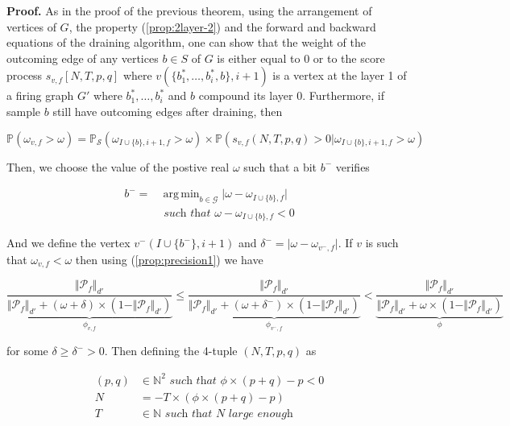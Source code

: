 \documentclass[a4paper, 11pt]{article}
\DeclareMathOperator*{\argmin}{arg\,min}
\begin{document}
\textbf{Proof.} 
As in the proof of the previous theorem, using the arrangement of vertices of $G$, the property (\ref{prop:2layer-2}) and the forward and backward equations of the draining algorithm, one can show that the weight of the outcoming edge of any vertices $b \in S$ of $G$ is either equal to 0 or to the score process $s_{v, f}[N, T, p, q]$ where $v(\{b_1^{*}, \ldots, b_i^{*}, b\}, i+1)$ is a vertex at the layer 1 of a firing graph $G'$ where $b_1^{*}, \ldots, b_i^{*}$ and $b$ compound its layer 0. Furthermore, if sample $b$ still have outcoming edges after draining, then

\begin{equation*}
\mathbb{P} \left( \omega_{v, f} >  \omega \right) = \mathbb{P}_{\mathcal{S}} \left( \omega_{I \cup \{b\}, i + 1, f } > \omega \right) \times \mathbb{P} \left( s_{v, f}(N, T, p, q) > 0 \vert \omega_{I \cup \{ b \}, i + 1, f} > \omega \right)
\end{equation*}

Then, we choose the value of the postive real $\omega$ such that a bit $b^{-}$ verifies

\begin{align*}
b^{-} = &\argmin_{b \in \mathcal{G}} \vert \omega - \omega_{I \cup \{ b \}, f} \vert \\
&\textit{ such that } \omega - \omega_{I \cup \{ b \}, f} < 0 
\end{align*}

And we define the vertex $v^{-}(I \cup \{b^{-}\}, i+1)$ and $\delta^{-} = \vert \omega - \omega_{v^{-}, f} \vert$. If $v$ is such that $\omega_{v, f}  < \omega$ then using (\ref{prop:precision1}) we have 

\begin{equation*}
\underbrace{\frac{\Vert \mathcal{P}_{f} \Vert_{d'}}{\Vert \mathcal{P}_{f} \Vert_{d'} + (\omega + \delta) \times (1-\Vert \mathcal{P}_{f} \Vert_{d'})}}_{\phi_{v, f}} \leq \underbrace{\frac{\Vert \mathcal{P}_{f} \Vert_{d'}}{\Vert \mathcal{P}_{f} \Vert_{d'} + (\omega + \delta^{-}) \times (1 - \Vert \mathcal{P}_{f} \Vert_{d'})}}_{\phi_{v^{-}, f}} < \underbrace{\frac{\Vert \mathcal{P}_{f} \Vert_{d'}}{\Vert \mathcal{P}_{f} \Vert_{d'} + \omega \times (1 - \Vert \mathcal{P}_{f} \Vert_{d'})}}_{\phi}
\end{equation*}

for some $\delta \geq \delta^{-} > 0$. Then defining the 4-tuple $(N, T, p, q)$ as


\begin{align*}
(p, q) &\in \mathbb{N}^{2} \textit{ such that } \phi \times (p + q) - p < 0\\
N &= -T \times (\phi \times (p+q) - p)\\
T &\in \mathbb{N} \textit{ such that } N \textit{ large enough}
\end{align*}
\end{document}

